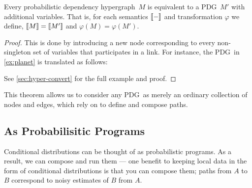 \documentclass{article}
\newcommand\changeon{\color{note-fg} }
\newcommand\Set{\textbf{Set}}
\newcommand{\modelnamehyper}{probabilistic dependency hypergraph}
\newcommand{\MN}{PDG}
\begin{document}
	\begin{theorem}[restate=thmhyperequiv]\label{thm:hyperequiv}
		Every \modelnamehyper\ $M$ is equivalent to a \MN\ $M'$ with additional variables. That is, for each semantics $\llbracket-\rrbracket$ and transformation $\varphi$ we define, $\llbracket M\rrbracket = \llbracket M'\rrbracket$ and $\varphi(M) = \varphi(M')$.
	\end{theorem}
	\begin{proof}
		This is done by introducing a new node corresponding to every non-singleton set of variables that participates in a link. For instance, the \MN\ in \cref{ex:planet} is translated as follows:
		\begin{center}
		\end{center}
		See \cref{sec:hyper-convert} for the full example and proof.
	\end{proof}
	
	This theorem allows us to consider any \MN\ as merely an ordinary collection of nodes and edges, which rely on to define and compose paths.
	

	
	
	\subsection{As Probabilisitic Programs}\label{sec:prog-semantics}
	\changeon
	Conditional distributions can be thought of as probabilistic programs. As a result, we can compose and run them --- one  benefit to keeping local data in the form of conditional distributions is that you can compose them; paths from $A$ to $B$ correspond to noisy estimates of $B$ from $A$.
	
\end{document}
